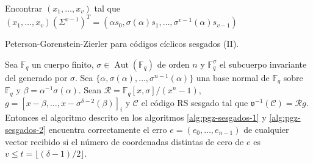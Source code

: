 \begin{Ualgorithm}[htbp]
  \DontPrintSemicolon
  \setcounter{AlgoLine}{17}
  Encontrar \((x_1, \dots, x_v)\) tal que \((x_1, \dots, x_v)(\Sigma^{v-1})^T = (\alpha s_0, \sigma(\alpha)s_1, \dots, \sigma^{v-1}(\alpha)s_{v-1})\)\;\label{algl:pgz-sesgados-solucion-sistema}
  \caption{Peterson-Gorenstein-Zierler para códigos cíclicos sesgados (II).}
  \label{alg:pgz-sesgados-2}
\end{Ualgorithm}

\begin{theorem}
  Sea \(\mathbb F_q\) un cuerpo finito, \(\sigma \in \operatorname{Aut}(\mathbb F_q)\) de orden \(n\) y \(\mathbb F_q^{\sigma}\) el subcuerpo invariante del generado por \(\sigma\).
  Sea \(\{\alpha, \sigma(\alpha), \dots, \sigma^{n-1}(\alpha)\}\) una base normal de \(\mathbb F_q\) sobre \(\mathbb F_{q}\) y \(\beta = \alpha^{-1}\sigma(\alpha)\).
  Sean \(\mathcal R = \mathbb F_q[x, \sigma]/(x^n - 1)\), \(g = \left[x - \beta, \dots, x - \sigma^{\delta - 2}(\beta)\right]_{i}\) y \(\mathcal C\) el código RS sesgado tal que \(\mathfrak v^{-1}(\mathcal C) = \mathcal Rg\).
  Entonces el algoritmo descrito en los algoritmos \ref{alg:pgz-sesgados-1} y \ref{alg:pgz-sesgados-2} encuentra correctamente el erro \(e = (e_0, \dots, e_{n-1})\) de cualquier vector recibido si el número de coordenadas distintas de cero de \(e\) es \(v \leq t = \lfloor (\delta - 1)/2 \rfloor\).
\end{theorem}

